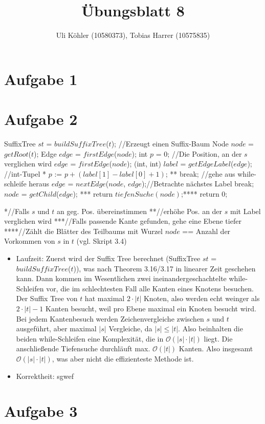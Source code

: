 \documentclass[a4paper,10pt,oneside,leqno]{scrartcl}
\title{Übungsblatt 8}
\author{Uli Köhler (10580373), Tobias Harrer (10575835)}
\begin{document}
\maketitle
\section*{Aufgabe 1}
\section*{Aufgabe 2}
\begin{algorithmic}
  \State SuffixTree $st$ = $buildSuffixTree$($t$); //Erzeugt einen Suffix-Baum
  \State Node $node$ = $getRoot$($t$);
  \State Edge $edge$ = $firstEdge$($node$);
  \State int $p$ = 0; //Die Position, an der $s$ verglichen wird
    \State $edge$ = $firstEdge$($node$);
      \State (int, int) $label$ = $getEdgeLabel$($edge$); //int-Tupel
       *
	\State $p$ := $p+(label[1]-label[0]+1)$; **
	\State break; //gehe aus while-schleife heraus
      \EndIf
      \State $edge$ = $nextEdge$($node$, $edge$);//Betrachte nächstes Label
    \EndWhile
    \State break;
    \Else
    \State $node$ = $getChild$($edge$); ***
    \EndIf
  \EndWhile
    \State return $tiefenSuche(node)$;****
  \Else
    \State return 0;
  \EndIf
 \EndFunction
\end{algorithmic}
*//Falls $s$ und $t$ an geg. Pos. übereinstimmen\newline
**//erhöhe Pos. an der $s$ mit Label verglichen wird\newline
***//Falls passende Kante gefunden, gehe eine Ebene tiefer\newline
****//Zählt die Blätter des Teilbaums mit Wurzel $node$ == Anzahl der Vorkommen von $s$ in $t$ (vgl. Skript 3.4)\newline

\begin{itemize}
 \item Laufzeit: Zuerst wird der Suffix Tree berechnet (SuffixTree $st$ = $buildSuffixTree$($t$)), was nach Theorem 3.16/3.17 in linearer
 Zeit geschehen kann. Dann kommen im Wesentlichen zwei ineinandergeschachtelte while-Schleifen vor, die im schlechtesten Fall alle
 Kanten eines Knotens besuchen. Der Suffix Tree von $t$ hat maximal $2\cdot |t|$ Knoten, also werden echt weinger als $2\cdot |t|-1$ Kanten besucht,
 weil pro Ebene maximal ein Knoten besucht wird. Bei jedem Kantenbesuch werden Zeichenvergleiche zwischen $s$ und $t$ ausgeführt, aber maximal
 $|s|$ Vergleiche, da $|s| \leq |t|$. Also beinhalten die beiden while-Schleifen eine Komplexität, die in $\mathcal{O}(|s| \cdot |t|)$ liegt.
 Die anschließende Tiefensuche durchläuft max. $\mathcal{O}(|t|)$ Kanten. Also insgesamt $\mathcal{O}(|s| \cdot |t|)$, was aber nicht die effizienteste
 Methode ist.
 
 \item Korrektheit: sgwef
\end{itemize}

\section*{Aufgabe 3}
\end{document}
